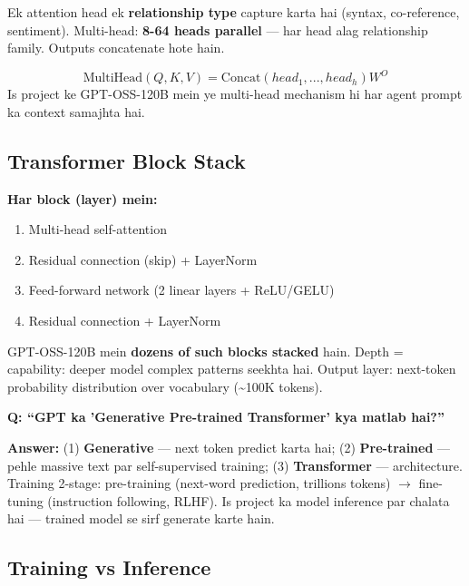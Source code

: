 \begin{conceptbox}
Ek attention head ek \textbf{relationship type} capture karta hai (syntax, co-reference, sentiment). Multi-head: \textbf{8-64 heads parallel} --- har head alag relationship family. Outputs concatenate hote hain.

\[
\text{MultiHead}(Q,K,V) = \text{Concat}(head_1, ..., head_h)W^O
\]
Is project ke GPT-OSS-120B mein ye multi-head mechanism hi har agent prompt ka context samajhta hai.
\end{conceptbox}

\subsection{Transformer Block Stack}

\begin{conceptbox}
\textbf{Har block (layer) mein:}
\begin{enumerate}[label=\arabic*.]
\item Multi-head self-attention
\item Residual connection (skip) + LayerNorm
\item Feed-forward network (2 linear layers + ReLU/GELU)
\item Residual connection + LayerNorm
\end{enumerate}

GPT-OSS-120B mein \textbf{dozens of such blocks stacked} hain. Depth = capability: deeper model complex patterns seekhta hai. Output layer: next-token probability distribution over vocabulary (\textasciitilde100K tokens).
\end{conceptbox}

\begin{interviewbox}
\textbf{Q: ``GPT ka 'Generative Pre-trained Transformer' kya matlab hai?''}

\textbf{Answer:} (1) \textbf{Generative} --- next token predict karta hai; (2) \textbf{Pre-trained} --- pehle massive text par self-supervised training; (3) \textbf{Transformer} --- architecture. Training 2-stage: pre-training (next-word prediction, trillions tokens) $\rightarrow$ fine-tuning (instruction following, RLHF). Is project ka model inference par chalata hai --- trained model se sirf generate karte hain.
\end{interviewbox}

\subsection{Training vs Inference}

